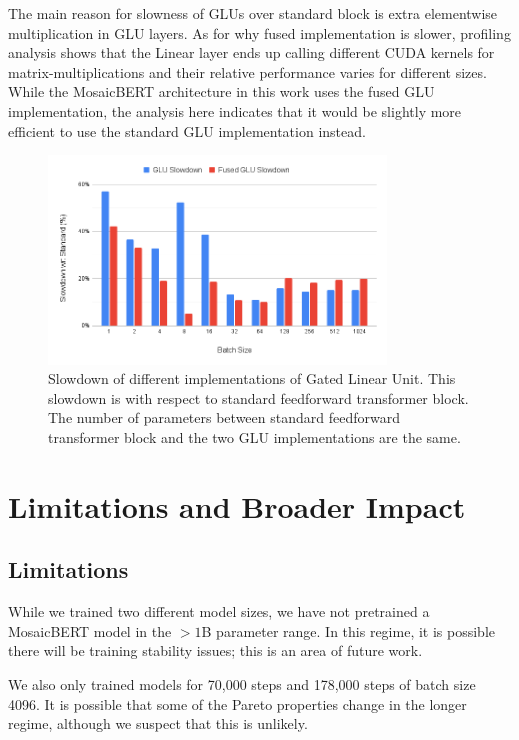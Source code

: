 The main reason for slowness of GLUs over standard block is extra elementwise multiplication in GLU layers. As for why fused implementation is slower, profiling analysis shows that the Linear layer ends up calling different CUDA kernels for matrix-multiplications and their relative performance varies for different sizes. While the MosaicBERT architecture in this work uses the fused GLU implementation, the analysis here indicates that it would be slightly more efficient to use the standard GLU implementation instead.

\begin{figure}
    \centering
    \includegraphics[width=0.8\textwidth]{figures/glu_slowdowns.png}
    \caption{Slowdown of different implementations of Gated Linear Unit. This slowdown is with respect to standard feedforward transformer block. The number of parameters between standard feedforward transformer block and the two GLU implementations are the same.}
    \label{fig:glu-slowdown}
\end{figure}


\section{Limitations and Broader Impact}

\subsection{Limitations}
While we trained two different model sizes, we have not pretrained a MosaicBERT model in the $>1$B parameter range. In this regime, it is possible there will be training stability issues; this is an area of future work.

We also only trained models for 70,000 steps and 178,000 steps of batch size 4096. It is possible that some of the Pareto properties change in the longer regime, although we suspect that this is unlikely.

